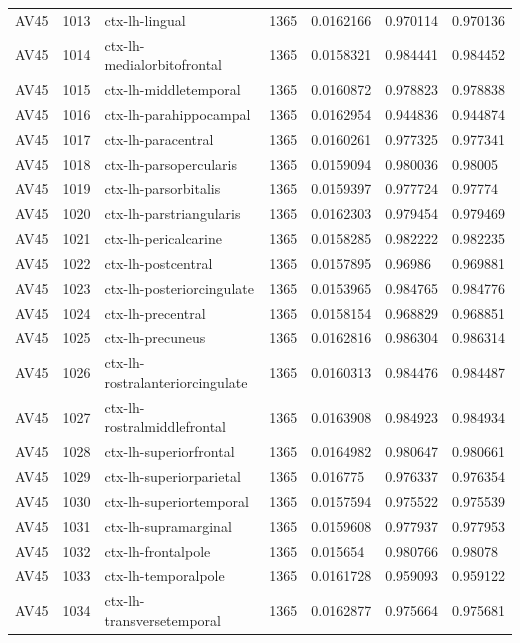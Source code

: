 \begin{landscape}
\begin{longtable}{lllllll}
AV45 & 1013 & ctx-lh-lingual & 1365 & 0.0162166 & 0.970114 & 0.970136 \\
AV45 & 1014 & ctx-lh-medialorbitofrontal & 1365 & 0.0158321 & 0.984441 & 0.984452 \\
AV45 & 1015 & ctx-lh-middletemporal & 1365 & 0.0160872 & 0.978823 & 0.978838 \\
AV45 & 1016 & ctx-lh-parahippocampal & 1365 & 0.0162954 & 0.944836 & 0.944874 \\
AV45 & 1017 & ctx-lh-paracentral & 1365 & 0.0160261 & 0.977325 & 0.977341 \\
AV45 & 1018 & ctx-lh-parsopercularis & 1365 & 0.0159094 & 0.980036 & 0.98005 \\
AV45 & 1019 & ctx-lh-parsorbitalis & 1365 & 0.0159397 & 0.977724 & 0.97774 \\
AV45 & 1020 & ctx-lh-parstriangularis & 1365 & 0.0162303 & 0.979454 & 0.979469 \\
AV45 & 1021 & ctx-lh-pericalcarine & 1365 & 0.0158285 & 0.982222 & 0.982235 \\
AV45 & 1022 & ctx-lh-postcentral & 1365 & 0.0157895 & 0.96986 & 0.969881 \\
AV45 & 1023 & ctx-lh-posteriorcingulate & 1365 & 0.0153965 & 0.984765 & 0.984776 \\
AV45 & 1024 & ctx-lh-precentral & 1365 & 0.0158154 & 0.968829 & 0.968851 \\
AV45 & 1025 & ctx-lh-precuneus & 1365 & 0.0162816 & 0.986304 & 0.986314 \\
AV45 & 1026 & ctx-lh-rostralanteriorcingulate & 1365 & 0.0160313 & 0.984476 & 0.984487 \\
AV45 & 1027 & ctx-lh-rostralmiddlefrontal & 1365 & 0.0163908 & 0.984923 & 0.984934 \\
AV45 & 1028 & ctx-lh-superiorfrontal & 1365 & 0.0164982 & 0.980647 & 0.980661 \\
AV45 & 1029 & ctx-lh-superiorparietal & 1365 & 0.016775 & 0.976337 & 0.976354 \\
AV45 & 1030 & ctx-lh-superiortemporal & 1365 & 0.0157594 & 0.975522 & 0.975539 \\
AV45 & 1031 & ctx-lh-supramarginal & 1365 & 0.0159608 & 0.977937 & 0.977953 \\
AV45 & 1032 & ctx-lh-frontalpole & 1365 & 0.015654 & 0.980766 & 0.98078 \\
AV45 & 1033 & ctx-lh-temporalpole & 1365 & 0.0161728 & 0.959093 & 0.959122 \\
AV45 & 1034 & ctx-lh-transversetemporal & 1365 & 0.0162877 & 0.975664 & 0.975681 \\

\end{longtable}
\end{landscape}
